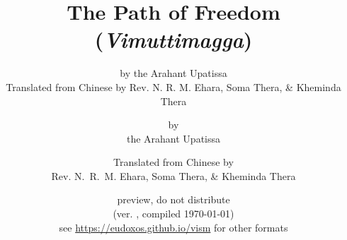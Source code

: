 

\def\thepageIssue{\href{https://github.com/eudoxos/vism/issues/new?title=Vimuttimagga\%20issue\%20at\%20page\%20\thepage\&body=(\vismCommitTimestampQuery)}{\thepage}}
\def\vismAssertFootnoteCounter#1{\relax}
\usepackage[stable]{footmisc}



	\title{The Path of Freedom \\ (\emph{Vimuttimagga})}
	\date{preview, do not distribute \\ (ver. \vismCommitHref, compiled \today) \\  see \url{https://eudoxos.github.io/vism} for other formats}
	\ifplastex
		\author{by the Arahant Upatissa \\ Translated from Chinese by Rev. N. R. M. Ehara, Soma Thera, \& Kheminda Thera}
	\else
		\author{by \\ the Arahant Upatissa \and Translated from Chinese by \\ Rev. N.~R.~M. Ehara, Soma Thera, \& Kheminda Thera}
	\fi
	\maketitle

	\frontmatter
		\bgroup
			\ifplastex\else\renewcommand{\baselinestretch}{0.2}\normalsize\fi
			\tableofcontents
		\egroup
		

